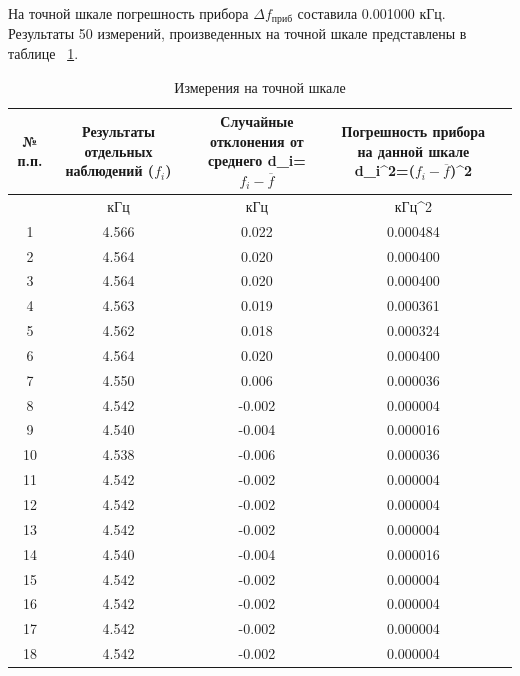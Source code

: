 На точной шкале погрешность прибора $\Delta f_{\text{приб}}$ составила 0.001000 кГц.
Результаты 50 измерений, произведенных на точной шкале представлены в таблице ~\ref{tabl:2}.
\begin{center}
\begin{table}[H]
\centering
\caption{Измерения на точной шкале}
\label{tabl:2}
\begin{tabular}{|c|c|c|c|c|}
\hline
\begin{minipage}{7mm}
    № п.п. 
\end{minipage}&
\begin{minipage}{5cm}
    Результаты отдельных наблюдений ($f_i$)
\end{minipage} &
\begin{minipage}{5cm}
    Случайные отклонения от среднего d_i=$f_i-\overline{f}$
\end{minipage} &
\begin{minipage}{5cm}
    Погрешность прибора на данной шкале d_i^2=($f_i-$$\overline{f}$)^2
\end{minipage}\\
\hline
{}&кГц&кГц&кГц^2\\
\hline
1  &    4.566  &  0.022 & 0.000484 \\
2  &    4.564  &  0.020 & 0.000400 \\
3  &    4.564  &  0.020 & 0.000400 \\
4  &    4.563  &  0.019 & 0.000361 \\
5  &    4.562  &  0.018 & 0.000324 \\
6  &    4.564  &  0.020 & 0.000400 \\
7  &    4.550  &  0.006 & 0.000036 \\
8  &    4.542  &  -0.002 & 0.000004 \\
9  &    4.540  &  -0.004 & 0.000016 \\
10 &  4.538  &  -0.006 & 0.000036 \\
11 &  4.542  &  -0.002 & 0.000004 \\
12 &  4.542  &  -0.002 & 0.000004 \\
13 &  4.542  &  -0.002 & 0.000004 \\
14 &  4.540  &  -0.004 & 0.000016 \\
15 &  4.542  &  -0.002 & 0.000004 \\
16 &  4.542  &  -0.002 & 0.000004 \\
17 &  4.542  &  -0.002 & 0.000004 \\
18 &  4.542  &  -0.002 & 0.000004 \\

\end{tabular}
\end{table}
\end{center}
